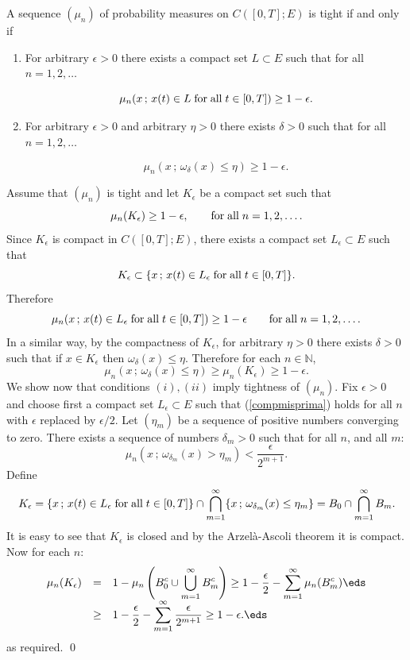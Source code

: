 \documentclass[preprint]{imsart}
\def\N{\mathbb N}
\def\ds{\displaystyle}
\begin{document}
{\begin{Theorem}\label{compinc}
A sequence $(\mu_n)$ of probability measures on
$C([0,T]; E)$ is tight if and only if
\begin{enumerate}
  \item[(i)] For arbitrary $\epsilon >0$ there exists
  a compact set $L\subset E$ such that for all
  $n=1,2,\ldots$

\begin{equation}\label{compmisprima}
\mu_n (x\, ; \, x(t)\in L {\rm \; for \; all \;}
t\in [0,T] ) \geq 1-\epsilon.
\end{equation}


  \item[(ii)] For arbitrary $\epsilon >0$ and arbitrary
  $\eta >0$  there exists
  $\delta >0$ such that  for all
  $n=1,2,\ldots$


\begin{equation}\label{compmisseconda}
\mu_n (x\, ; \, \omega_\delta (x)\leq \eta )
 \geq 1-\epsilon.
\end{equation}


\end{enumerate}
\end{Theorem}



Assume that $(\mu_n)$ is tight and let $K_\epsilon$ be
a compact set such that
$$
\mu_n(K_\epsilon)\geq 1-\epsilon,
\qquad {\rm for\; all\; }n=1,2,\ldots.
$$
Since $K_\epsilon$ is compact in $C([0,T];E)$, there
exists a compact set $L_\epsilon\subset E$ such that
$$
K_\epsilon\subset \{ x\, ;\, x(t)\in L_\epsilon {\rm \;
for
\; all\; } t\in [0,T]\}.
$$
Therefore
$$
\mu_n (x\, ; \, x(t)\in L_\epsilon {\rm \; for \; all \;}
t\in [0,T] ) \geq 1-\epsilon
\qquad {\rm for\; all\; }n=1,2,\ldots.
$$
In a similar way, by the compactness of $K_\epsilon$,
for arbitrary $\eta >0$ there exists $\delta >0$ such
that if $x\in K_\epsilon$ then $\omega_\delta
(x)\leq\eta$. Therefore for each $n\in\N$,
$$
\mu_n (x\, ; \, \omega_\delta (x)\leq \eta )
\geq \mu_n(K_\epsilon) \geq 1-\epsilon .
$$
We show now that conditions $(i),(ii)$ imply tightness
of $(\mu_n)$. Fix $\epsilon >0$ and choose first a
compact set $L_\epsilon \subset E$ such that
(\ref{compmisprima}) holds for all $n$ with $\epsilon$
replaced by $\epsilon /2$. Let $(\eta_m)$ be a sequence
of positive numbers converging to zero. There exists a
sequence of numbers $\delta_m >0$ such that for all
$n$, and all $m$:
$$
\mu_n( x\, ;\, \omega_{\delta_m}(x)>\eta_m)
<\frac{\epsilon}{2^{m+1}}.
$$
Define
$$
K_\epsilon = \{ x\, ;\, x(t)\in L_\epsilon {\rm
\; for \; all\;} t\in [0,T]\}
\cap
\bigcap_{m=1}^\infty \{ x\, ;\,
\omega_{\delta_m}(x)\leq\eta_m\}
= B_0 \cap \bigcap_{m=1}^\infty B_m.
$$
It is easy to see that $K_\epsilon$ is closed and by
the Arzel\`a-Ascoli theorem it is compact. Now for each
$n$:
$$
  \begin{array}{lll}
    \mu_n(K_\epsilon) & = &
    \ds
1-\mu_n\left(B_0^c \cup\bigcup_{m=1}^\infty
B_m^c\right)
\geq 1-\frac{\epsilon}{2}-\sum_{m=1}^\infty
\mu_n(B_m^c)
    \eds \\
    &\geq & \ds 1-\frac{\epsilon}{2}-\sum_{m=1}^\infty
\frac{\epsilon}{2^{m+1}}\geq 1-\epsilon.\eds
  \end{array}
$$
as required. \qed

}
\end{document}

